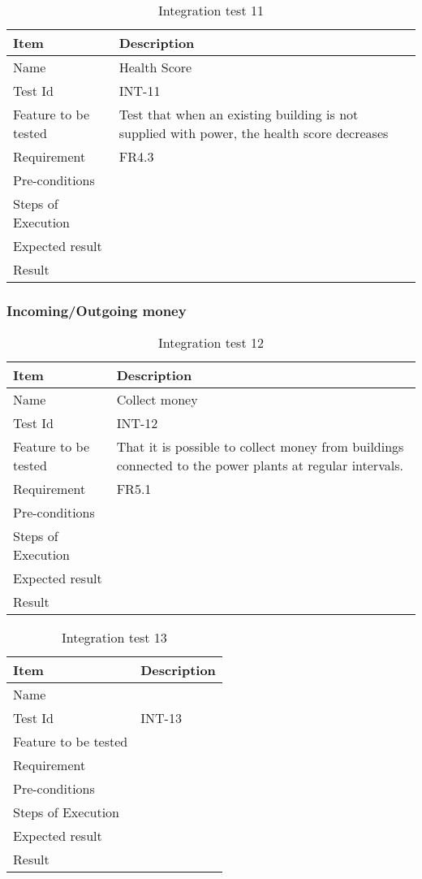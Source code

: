 \begin{table}[H]
\centering
	\begin{tabular}{ l | p{8cm} }
		\hline
		{\bf Item} & {\bf Description} \\ \hline
		Name & Health Score \\ 
		Test Id & INT-11 \\ 
		Feature to be tested & Test that when an existing building is not supplied with power, the health score decreases \\ 
		Requirement & FR4.3 \\ 
		Pre-conditions & \\ 
		Steps of Execution & \\ 
		Expected result & \\ 
		Result & \\ 
	\end{tabular}
	\caption{Integration test 11}
\end{table}

\subsubsection{Incoming/Outgoing money}

\begin{table}[H]
\centering
	\begin{tabular}{ l | p{8cm} }
		\hline
		{\bf Item} & {\bf Description} \\ \hline
		Name & Collect money \\ 
		Test Id & INT-12 \\ 
		Feature to be tested & That it is possible to collect money from buildings connected to the power plants at regular intervals. \\
		Requirement & FR5.1 \\ 
		Pre-conditions & \\ 
		Steps of Execution & \\ 
		Expected result & \\ 
		Result & \\ 
	\end{tabular}
	\caption{Integration test 12}
\end{table}

\begin{table}[H]
\centering
	\begin{tabular}{ l | p{8cm} }
		\hline
		{\bf Item} & {\bf Description} \\ \hline
		Name & \\ 
		Test Id & INT-13 \\ 
		Feature to be tested & \\ 
		Requirement & \\ 
		Pre-conditions & \\ 
		Steps of Execution & \\ 
		Expected result & \\ 
		Result & \\ 
	\end{tabular}
	\caption{Integration test 13}
\end{table}

